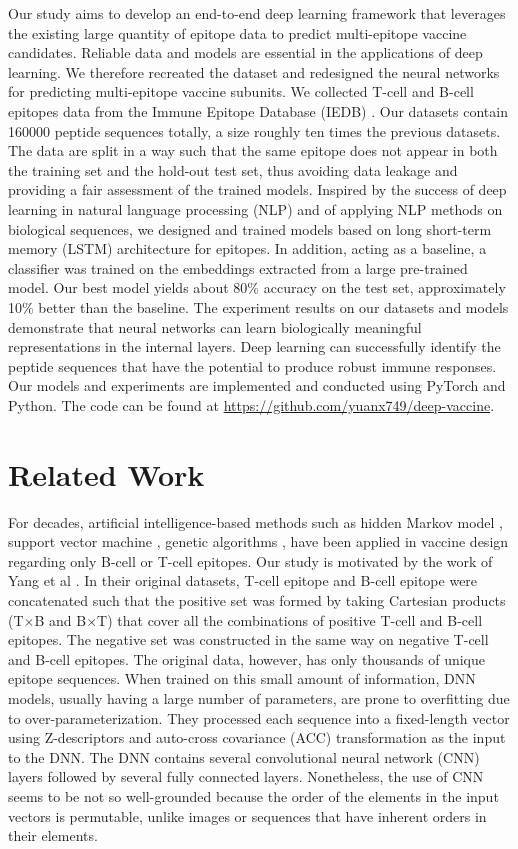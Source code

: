 \documentclass[conference]{IEEEtran}
\begin{document}
Our study aims to develop an end-to-end deep learning framework that leverages the existing large quantity of epitope data to predict multi-epitope vaccine candidates. Reliable data and models are essential in the applications of deep learning. We therefore recreated the dataset and redesigned the neural networks for predicting multi-epitope vaccine subunits. We collected T-cell and B-cell epitopes data from the Immune Epitope Database (IEDB) \cite{Fleri_2017a}. Our datasets contain 160000 peptide sequences totally, a size roughly ten times the previous datasets. The data are split in a way such that the same epitope does not appear in both the training set and the hold-out test set, thus avoiding data leakage and providing a fair assessment of the trained models. Inspired by the success of deep learning in natural language processing (NLP) and of applying NLP methods on biological sequences, we designed and trained models based on long short-term memory (LSTM) architecture for epitopes. In addition, acting as a baseline, a classifier was trained on the embeddings extracted from a large pre-trained model. Our best model yields about 80\% accuracy on the test set, approximately 10\% better than the baseline. The experiment results on our datasets and models demonstrate that neural networks can learn biologically meaningful representations in the internal layers. Deep learning can successfully identify the peptide sequences that have the potential to produce robust immune responses. Our models and experiments are implemented and conducted using PyTorch and Python. The code can be found at \url{https://github.com/yuanx749/deep-vaccine}.

\section{Related Work}
For decades, artificial intelligence-based methods such as hidden Markov model \cite{Larsen_2006}, support vector machine \cite{EL_Manzalawy_2008}, genetic algorithms \cite{Fischer_2006}, have been applied in vaccine design regarding only B-cell or T-cell epitopes. Our study is motivated by the work of Yang et al \cite{Yang_2021}. In their original datasets, T-cell epitope and B-cell epitope were concatenated such that the positive set was formed by taking Cartesian products (T$\times$B and B$\times$T) that cover all the combinations of positive T-cell and B-cell epitopes. The negative set was constructed in the same way on negative T-cell and B-cell epitopes. The original data, however, has only thousands of unique epitope sequences. When trained on this small amount of information, DNN models, usually having a large number of parameters, are prone to overfitting due to over-parameterization. They processed each sequence into a fixed-length vector using Z-descriptors \cite{Hellberg_1987} and auto-cross covariance (ACC) transformation \cite{Wold_1993} as the input to the DNN. The DNN contains several convolutional neural network (CNN) layers followed by several fully connected layers. Nonetheless, the use of CNN seems to be not so well-grounded because the order of the elements in the input vectors is permutable, unlike images or sequences that have inherent orders in their elements.
\end{document}
